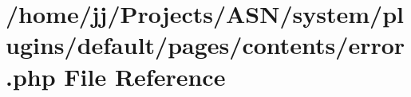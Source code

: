 \hypertarget{system_2plugins_2default_2pages_2contents_2error_8php}{}\section{/home/jj/\+Projects/\+A\+S\+N/system/plugins/default/pages/contents/error.php File Reference}
\label{system_2plugins_2default_2pages_2contents_2error_8php}
